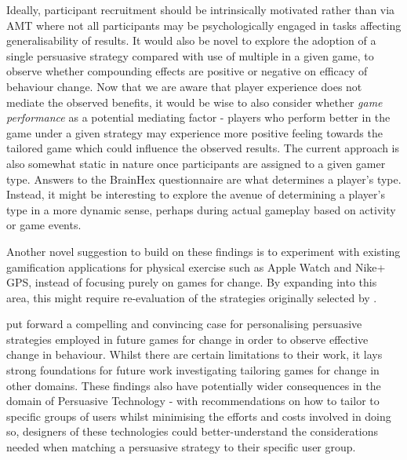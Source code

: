 \documentclass[11pt]{article}
\begin{document}
Ideally, participant recruitment should be intrinsically motivated rather than via AMT where not all participants may be psychologically engaged in tasks affecting generalisability of results. It would also be novel to explore the adoption of a single persuasive strategy compared with use of multiple in a given game, to observe whether compounding effects are positive or negative on efficacy of behaviour change. Now that we are aware that player experience does not mediate the observed benefits, it would be wise to also consider whether \textit{game performance} as a potential mediating factor - players who perform better in the game under a given strategy may experience more positive feeling towards the tailored game which could influence the observed results. The current approach is also somewhat static in nature once participants are assigned to a given gamer type. Answers to the BrainHex questionnaire are what determines a player's type. Instead, it might be interesting to explore the avenue of determining a player's type in a more dynamic sense, perhaps during actual gameplay based on activity or game events.

Another novel suggestion to build on these findings is to experiment with existing gamification applications for physical exercise such as Apple Watch and Nike+ GPS, instead of focusing purely on games for change. By expanding into this area, this might require re-evaluation of the strategies originally selected by \citet{gerling2014}.

\citet{orji2017} put forward a compelling and convincing case for personalising persuasive strategies employed in future games for change in order to observe effective change in behaviour. Whilst there are certain limitations to their work, it lays strong foundations for future work investigating tailoring games for change in other domains. These findings also have potentially wider consequences in the domain of Persuasive Technology - with recommendations on how to tailor to specific groups of users whilst minimising the efforts and costs involved in doing so, designers of these technologies could better-understand the considerations needed when matching a persuasive strategy to their specific user group.


\newpage
\small

\normalsize
\end{document}
